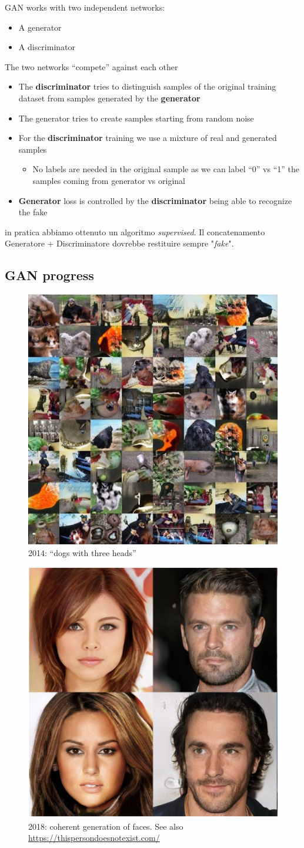 GAN works with two independent networks:

\begin{itemize}
	\item A generator
	\item A discriminator
\end{itemize}

The two networks “compete” against each other

\begin{itemize}
	\item The \textbf{discriminator} tries to distinguish samples of the original training dataset from samples generated by the \textbf{generator}
	\item The generator tries to create samples starting from random noise
	\item For the \textbf{discriminator} training we use a mixture of real and generated samples
	\begin{itemize}
		\item No labels are needed in the original	sample as we can label “0” vs “1” the
		samples coming from generator vs original
	\end{itemize}
	\item \textbf{Generator} loss is controlled by the \textbf{discriminator} being able to recognize the fake
\end{itemize}
in pratica abbiamo ottenuto un algoritmo \textit{supervised}. Il concatenamento Generatore + Discriminatore dovrebbe restituire sempre "\textit{fake}".

\subsection{GAN progress}


\begin{figure}[ht]
	\centering
	\includegraphics[width=0.33\linewidth]{figure_ml/dogs.png}
	\caption{2014: “dogs with three heads”}
\end{figure}
\FloatBarrier

\begin{figure}[ht]
	\centering
	\includegraphics[width=0.33\linewidth]{figure_ml/faces.png}
	\caption{2018: coherent generation of faces. See also \url{https://thispersondoesnotexist.com/}}
\end{figure}



